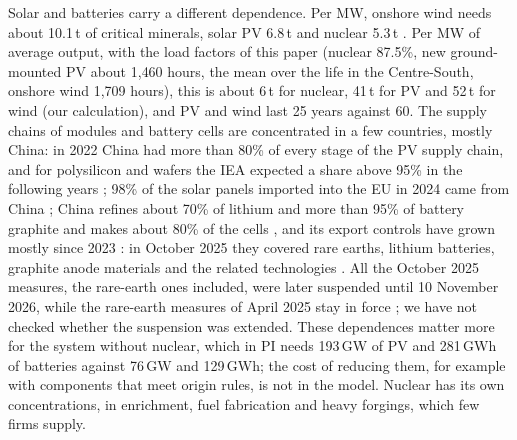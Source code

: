 Solar and batteries carry a different dependence. Per MW, onshore wind needs about 10.1\,t of critical minerals, solar PV 6.8\,t and nuclear 5.3\,t \citep{WNAMinerals}. Per MW of average output, with the load factors of this paper (nuclear 87.5\%, new ground-mounted PV about 1{,}460 hours, the mean over the life in the Centre-South, onshore wind 1{,}709 hours), this is about 6\,t for nuclear, 41\,t for PV and 52\,t for wind (our calculation), and PV and wind last 25 years against 60. The supply chains of modules and battery cells are concentrated in a few countries, mostly China: in 2022 China had more than 80\% of every stage of the PV supply chain, and for polysilicon and wafers the IEA expected a share above 95\% in the following years \citep{IEAPVSupply2022}; 98\% of the solar panels imported into the EU in 2024 came from China \citep{EurostatGreenTrade2025}; China refines about 70\% of lithium and more than 95\% of battery graphite and makes about 80\% of the cells \citep{Mercom2025}, and its export controls have grown mostly since 2023 \citep{IEAGCMO2025}: in October 2025 they covered rare earths, lithium batteries, graphite anode materials and the related technologies \citep{TR2025}. All the October 2025 measures, the rare-earth ones included, were later suspended until 10 November 2026, while the rare-earth measures of April 2025 stay in force \citep{Pillsbury2025}; we have not checked whether the suspension was extended. These dependences matter more for the system without nuclear, which in PI needs 193\,GW of PV and 281\,GWh of batteries against 76\,GW and 129\,GWh; the cost of reducing them, for example with components that meet origin rules, is not in the model. Nuclear has its own concentrations, in enrichment, fuel fabrication and heavy forgings, which few firms supply.

